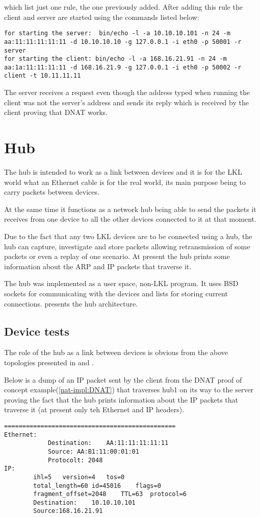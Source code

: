 {{\begin{itemize}
which list just one rule, the one previously added. 
After adding this rule the client and server are started using the commands listed below:
\lstset{language=TeX, caption=SNAT-starting client and server applications}
\begin{lstlisting}
for starting the server:  bin/echo -l -a 10.10.10.101 -n 24 -m aa:11:11:11:11:11 -d 10.10.10.10 -g 127.0.0.1 -i eth0 -p 50001 -r server
for starting the client: bin/echo -l -a 168.16.21.91 -n 24 -m aa:1a:11:11:11:11 -d 168.16.21.9 -g 127.0.0.1 -i eth0 -p 50002 -r client -t 10.11.11.11
\end{lstlisting}
 The server receives a request even though the address typed when running the client was not the server's address and sends its reply which is received by the client proving that DNAT works.
\end{itemize}
\section{Hub}
\label{sec:hub:impl}

The hub is intended to work as a link between devices and it is for the LKL world what an Ethernet cable is for the real world, its main purpose being to carry packets between devices.

At the same time it functions as a network hub being able to send the packets it receives from one device to all the other devices connected to it at that moment.

Due to the fact that any two LKL devices are to be connected using a hub, the hub can capture, investigate and store packets allowing retransmission of some packets or even a replay of one scenario. At present the hub prints some information about the ARP and IP packets that traverse it. 

The hub was implemented as a user space, non-LKL program. It uses BSD sockets for communicating with the devices and lists for storing current connections.
 presents the hub architecture. 
\subsection{Device tests}
\label{sub-sec:router-tests}
The role of the hub as a link between devices is obvious from the above topologies presented in  and .

Below is a dump of an IP packet sent by the client from the DNAT proof of concept example(\ref{nat-impl:DNAT}) that traverses hub1 on its way to the server proving the fact that the hub prints information about the IP packets that traverse it (at present only teh Ethernet and IP headers).
\lstset{language=TeX, caption=Hub-print packet information}
\begin{lstlisting}
===============================================
Ethernet:
			Destination:	AA:11:11:11:11:11
			Source:	AA:B1:11:00:01:01
			Protocolt: 2048
IP:
		ihl=5	version=4	tos=0
		total_length=60	id=45016	flags=0
		fragment_offset=2048	TTL=63	protocol=6
		Destination:	10.10.10.101
		Source:168.16.21.91


\end{lstlisting}}}
